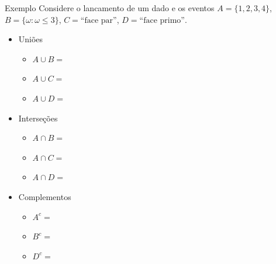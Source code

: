 \documentclass[10pt]{beamer}\usepackage[]{graphicx}\usepackage[]{color}
\theoremstyle{definition}
\begin{document}
\begin{frame}[fragile]{Exemplo}
  Considere o lancamento de um dado e os eventos $A = \{1,2,3,4\}$, $B =
  \{\omega:\omega\leq 3\}$, $C = \text{``face par''}$, $D = \text{``face
    primo''}$.
  \begin{itemize}
  \item Uniões
    \begin{itemize}
    \item $A\cup B =$ %
    \item $A\cup C =$ %
    \item $A\cup D =$ %
    \end{itemize}
  \end{itemize}
  \begin{itemize}
  \item Interseções
    \begin{itemize}
    \item $A\cap B =$ %
    \item $A\cap C =$ %
    \item $A\cap D =$ %
    \end{itemize}
  \end{itemize}
  \begin{itemize}
  \item Complementos
    \begin{itemize}
    \item $A^c =$ %
    \item $B^c =$ %
    \item $D^c =$ %
    \end{itemize}
  \end{itemize}
\end{frame}
\end{document}
